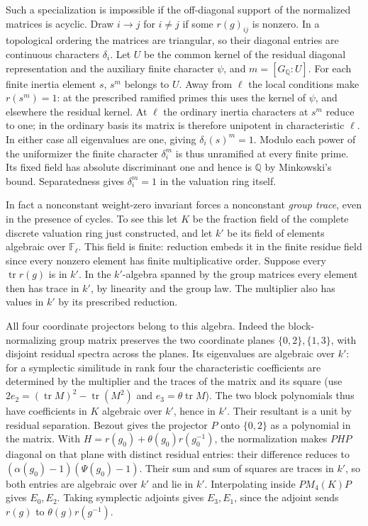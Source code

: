 \documentclass[11pt]{amsart}
\theoremstyle{definition}
\theoremstyle{remark}
\begin{document}
Such a specialization is impossible if the off-diagonal support
of the normalized matrices is acyclic. Draw $i\to j$ for $i\ne j$
if some $r(g)_{ij}$ is nonzero. In a topological ordering the
matrices are triangular, so their diagonal entries are continuous
characters $\delta_i$. Let $U$ be the common kernel of the residual
diagonal representation and the auxiliary finite character $\psi$,
and $m=[G_{\mathbb Q}:U]$. For each finite inertia element $s$,
$s^m$ belongs to $U$. Away from $\ell$ the local conditions make
$r(s^m)=1$: at the prescribed ramified primes this uses the kernel
of $\psi$, and elsewhere the residual kernel. At $\ell$ the
ordinary inertia characters at $s^m$ reduce to one; in the ordinary
basis its matrix is therefore unipotent in characteristic $\ell$.
In either case all eigenvalues are one, giving $\delta_i(s)^m=1$.
Modulo each power of the uniformizer the finite character
$\delta_i^m$ is thus unramified at every finite prime. Its fixed
field has absolute discriminant one and hence is $\mathbb Q$ by
Minkowski's bound. Separatedness gives $\delta_i^m=1$ in the
valuation ring itself.

In fact a nonconstant weight-zero invariant forces a nonconstant
\emph{group trace}, even in the presence of cycles. To see this let
$K$ be the fraction field of the complete discrete valuation ring
just constructed, and let $k'$ be its field of elements algebraic
over $\mathbb F_\ell$. This field is finite: reduction embeds it
in the finite residue field since every nonzero element has finite
multiplicative order. Suppose every $\operatorname{tr}r(g)$ is
in $k'$. In the $k'$-algebra spanned by the group matrices every
element then has trace in $k'$, by linearity and the group law.
The multiplier also has values in $k'$ by its prescribed reduction.

All four coordinate projectors belong to this algebra. Indeed the
block-normalizing group matrix preserves the two coordinate planes
$\{0,2\},\{1,3\}$, with disjoint residual spectra across the planes.
Its eigenvalues are algebraic over $k'$: for a symplectic similitude
in rank four the characteristic coefficients are determined by the
multiplier and the traces of the matrix and its square (use
$2e_2=(\operatorname{tr}M)^2-\operatorname{tr}(M^2)$ and
$e_3=\theta\operatorname{tr}M$). The two block polynomials thus
have coefficients in $K$ algebraic over $k'$, hence in $k'$.
Their resultant is a unit by residual separation. Bezout gives
the projector $P$ onto $\{0,2\}$ as a polynomial in the matrix.
With $H=r(g_0)+\theta(g_0)r(g_0^{-1})$, the normalization makes
$PHP$ diagonal on that plane with distinct residual entries:
their difference reduces to $(\alpha(g_0)-1)(\Psi(g_0)-1)$.
Their sum and sum of squares are traces in $k'$, so both entries
are algebraic over $k'$ and lie in $k'$. Interpolating inside
$P M_4(K)P$ gives $E_0,E_2$. Taking symplectic adjoints gives
$E_3,E_1$, since the adjoint sends $r(g)$ to $\theta(g)r(g^{-1})$.
\end{document}
